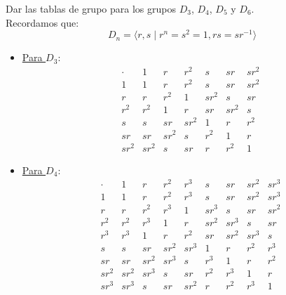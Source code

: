 \begin{ejercicio}\label{ej:2.11}
    Dar las tablas de grupo para los grupos $D_3$, $D_4$, $D_5$ y $D_6$.\\

    Recordamos que:
    \begin{equation*}
        D_n = \langle r, s \mid r^n = s^2 = 1, rs = sr^{-1}\rangle
    \end{equation*}

    \begin{itemize}
        \item \ul{Para $D_3$}:
        \begin{equation*}
            \begin{array}{c|cccccc}
                \cdot & 1 & r & r^2 & s & sr & sr^2 \\ \hline
                1 & 1 & r & r^2 & s & sr & sr^2 \\
                r & r & r^2 & 1 & sr^2 & s & sr \\
                r^2 & r^2 & 1 & r & sr & sr^2 & s \\
                s & s & sr & sr^2 & 1 & r & r^2 \\
                sr & sr & sr^2 & s & r^2 & 1 & r \\
                sr^2 & sr^2 & s & sr & r & r^2 & 1
            \end{array}
        \end{equation*}

        \item \ul{Para $D_4$}:
        \begin{equation*}
            \begin{array}{c|cccccccc}
                 \cdot & 1 & r & r^2 & r^3 & s & sr & sr^2 & sr^3 \\
                 \hline
                    1 & 1 & r & r^2 & r^3 & s & sr & sr^2 & sr^3 \\
                    r & r & r^2 & r^3 & 1 & sr^3 & s & sr & sr^2 \\
                    r^2 & r^2 & r^3 & 1 & r & sr^2 & sr^3 & s & sr \\
                    r^3 & r^3 & 1 & r & r^2 & sr & sr^2 & sr^3 & s \\
                    s & s & sr & sr^2 & sr^3 & 1 & r & r^2 & r^3 \\
                    sr & sr & sr^2 & sr^3 & s & r^3 & 1 & r & r^2 \\
                    sr^2 & sr^2 & sr^3 & s & sr & r^2 & r^3 & 1 & r \\
                    sr^3 & sr^3 & s & sr & sr^2 & r & r^2 & r^3 & 1 
            \end{array}
        \end{equation*}


\end{itemize}
\end{ejercicio}
